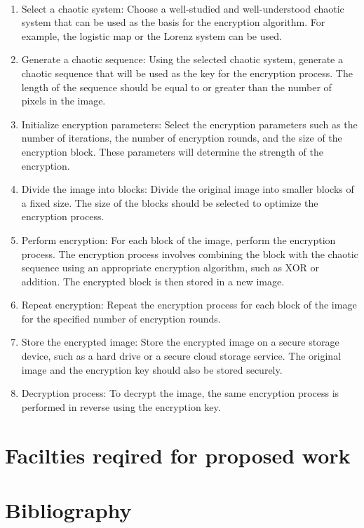 \documentclass[11pt,a4paper,english]{article}
\begin{document}
\paragraph{}
\begin{enumerate}
    \item Select a chaotic system: Choose a well-studied and well-understood chaotic system that can be used as the basis for the encryption algorithm. For example, the logistic map or the Lorenz system can be used.

    \item Generate a chaotic sequence: Using the selected chaotic system, generate a chaotic sequence that will be used as the key for the encryption process. The length of the sequence should be equal to or greater than the number of pixels in the image.

    \item Initialize encryption parameters: Select the encryption parameters such as the number of iterations, the number of encryption rounds, and the size of the encryption block. These parameters will determine the strength of the encryption.

    \item Divide the image into blocks: Divide the original image into smaller blocks of a fixed size. The size of the blocks should be selected to optimize the encryption process.

    \item Perform encryption: For each block of the image, perform the encryption process. The encryption process involves combining the block with the chaotic sequence using an appropriate encryption algorithm, such as XOR or addition. The encrypted block is then stored in a new image.

    \item Repeat encryption: Repeat the encryption process for each block of the image for the specified number of encryption rounds.

    \item Store the encrypted image: Store the encrypted image on a secure storage device, such as a hard drive or a secure cloud storage service. The original image and the encryption key should also be stored securely.

    \item Decryption process: To decrypt the image, the same encryption process is performed in reverse using the encryption key.
\end{enumerate}
\newpage
\section{Facilties reqired for proposed work}

\newpage
\section{Bibliography}

\nocite{*}
\end{document}
